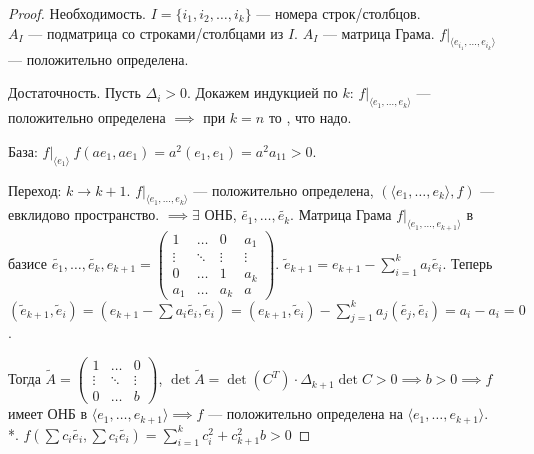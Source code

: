 \begin{proof}
    Необходимость. $I = \{i_1, i_2, \ldots, i_k\}$ --- номера строк/столбцов.
\\
    $A_I$ --- подматрица со строками/столбцами из  $I$.  $A_I$ --- матрица Грама.  $f\Big|_{\langle e_{i_1}, \ldots, e_{i_k} \rangle}$ --- положительно определена.

    Достаточность. Пусть $\Delta_i > 0$. Докажем индукцией по $k$:  $f\Big|_{\langle e_1, \ldots, e_k\rangle}$ ---  положительно определена $\implies$ при  $k = n$ то , что надо.

    База:  $f \Big|_{\langle e_1 \rangle}\ f(ae_1, ae_1) = a^2(e_1, e_1) = a^2a_{11} > 0$.

    Переход: $k \to k + 1$.  $f\Big|_{\langle e_1, \ldots, e_k \rangle}$ --- положительно определена, $(\langle e_1, \ldots, e_k \rangle, f)$ --- евклидово пространство. $\implies \exists$ ОНБ, $\widetilde{e_1}, \ldots, \widetilde{e_k}$. Матрица Грама $f \Big|_{\langle e_1, \ldots, e_{k+1} \rangle}$ в базисе $\widetilde{e_1}, \ldots, \widetilde{e_k}, e_{k+1} =
    \left(\begin{array}{ccc|c}
    1 & \ldots & 0 & a_1\\
    \vdots & \ddots & \vdots & \vdots\\
    0 & \ldots & 1 & a_k\\ \hline
    a_1 & \ldots & a_k & a
\end{array}\right)$. 
$\widetilde{e}_{k+1} = e_{k+1} - \sum\limits_{i=1}^k a_i\widetilde{e_i}$. Теперь $(\widetilde{e}_{k+1}, \widetilde{e}_i) = (e_{k+1} - \sum a_i \widetilde{e_i}, \widetilde{e}_i) = (e_{k+1}, \widetilde{e}_i) - \sum\limits_{j=1}^k a_j(\widetilde{e_j}, \widetilde{e_i}) = a_i - a_i = 0$.

Тогда $\widetilde{A} = 
\begin{pmatrix}
    1 & \ldots & 0\\
    \vdots & \ddots & \vdots\\
    0 & \ldots & b
\end{pmatrix}$, $\det \widetilde{A} = \det (C^T) \cdot \Delta_{k+1} \det C > 0 \implies b > 0 \implies f$ имеет ОНБ в $\langle e_1, \ldots, e_{k+1} \rangle \implies f$ --- положительно определена на $\langle e_1, \ldots, e_{k+1} \rangle$.\\
*. $f(\sum c_i \widetilde{e_i}, \sum c_i \widetilde{e_i}) = \sum_{i=1}^k c_i^2 + c_{k+1}^{2}b > 0$
\end{proof}
